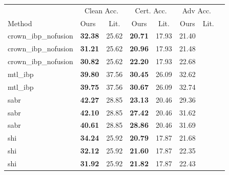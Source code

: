 \begin{tabular}{llcccccc}
\toprule
 & \multicolumn{2}{c}{Clean Acc.} & \multicolumn{2}{c}{Cert. Acc.} & \multicolumn{2}{c}{Adv Acc.} \\
Method & Ours & Lit. & Ours & Lit. & Ours & Lit. \\
\midrule
crown\_ibp\_nofusion & \textbf{32.38} & 25.62 & \textbf{20.71} & 17.93 & 21.40 & \\
crown\_ibp\_nofusion & \textbf{31.21} & 25.62 & \textbf{20.96} & 17.93 & 21.48 & \\
crown\_ibp\_nofusion & \textbf{30.82} & 25.62 & \textbf{22.20} & 17.93 & 22.68 & \\
mtl\_ibp & \textbf{39.80} & 37.56 & \textbf{30.45} & 26.09 & 32.62 & \\
mtl\_ibp & \textbf{39.75} & 37.56 & \textbf{30.67} & 26.09 & 32.74 & \\
sabr & \textbf{42.27} & 28.85 & \textbf{23.13} & 20.46 & 29.36 & \\
sabr & \textbf{42.10} & 28.85 & \textbf{27.42} & 20.46 & 31.62 & \\
sabr & \textbf{40.61} & 28.85 & \textbf{28.86} & 20.46 & 31.69 & \\
shi & \textbf{34.24} & 25.92 & \textbf{20.79} & 17.87 & 21.68 & \\
shi & \textbf{32.12} & 25.92 & \textbf{21.60} & 17.87 & 22.35 & \\
shi & \textbf{31.92} & 25.92 & \textbf{21.82} & 17.87 & 22.43 & \\
\bottomrule
\end{tabular}